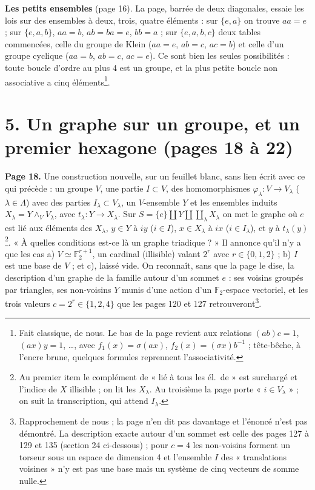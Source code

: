 \documentclass[11pt,a4paper]{article}
\begin{document}
\textbf{Les petits ensembles} (page 16). La page, barrée de deux diagonales,
essaie les lois sur des ensembles à deux, trois, quatre éléments : sur $\lbrace
e, a\rbrace$ on trouve $aa = e$ ; sur $\lbrace e, a, b\rbrace$, $aa = b$, $ab =
ba = e$, $bb = a$ ; sur $\lbrace e, a, b, c\rbrace$ deux tables commencées, celle du
groupe de Klein ($aa = e$, $ab = c$, $ac = b$) et celle d'un groupe cyclique
($aa = b$, $ab = c$, $ac = e$). Ce sont bien les seules possibilités : toute
boucle d'ordre au plus 4 est un groupe, et la plus petite boucle non
associative a cinq éléments\footnote{Fait classique, de nous. Le bas de la page
revient aux relations $(ab)c = 1$, $(ax)y = 1$, \ldots, avec $f_1(x) =
\sigma(ax)$, $f_2(x) = (\sigma x)b^{-1}$ ; tête-bêche, à l'encre brune, quelques
formules reprennent l'associativité.}.

\section*{5. Un graphe sur un groupe, et un premier hexagone (pages 18 à 22)}

\textbf{Page 18.} Une construction nouvelle, sur un feuillet blanc, sans lien
écrit avec ce qui précède : un groupe $V$, une partie $I \subset V$, des
homomorphismes $\varphi_\lambda : V \to V_\lambda$ ($\lambda \in \Lambda$) avec
des parties $I_\lambda \subset V_\lambda$, un $V$-ensemble $Y$ et les
ensembles induits $X_\lambda = Y \wedge_V V_\lambda$, avec $t_\lambda : Y \to
X_\lambda$. Sur $S = \lbrace e\rbrace \amalg Y \amalg \coprod_\lambda
X_\lambda$ on met le graphe où $e$ est lié aux éléments des $X_\lambda$, $y \in
Y$ à $iy$ ($i \in I$), $x \in X_\lambda$ à $ix$ ($i \in I_\lambda$), et $y$ à
$t_\lambda(y)$\footnote{Au premier item le complément de « lié à tous les él.\
de » est surchargé et l'indice de $X$ illisible ; on lit les $X_\lambda$. Au
troisième la page porte « $i \in V_\lambda$ » ; on suit la transcription, qui
attend $I_\lambda$.}. « À quelles conditions est-ce là un graphe triadique ? »
Il annonce qu'il n'y a que les cas a) $V \simeq \mathbb{F}_2^{r+1}$, un
cardinal (illisible) valant $2^r$ avec $r \in \lbrace 0, 1, 2\rbrace$ ; b) $I$
est une base de $V$ ; et c), laissé vide. On reconnaît, sans que la page le
dise, la description d'un graphe de la famille autour d'un sommet $e$ : ses
voisins groupés par triangles, ses non-voisins $Y$ munis d'une action d'un
$\mathbb{F}_2$-espace vectoriel, et les trois valeurs $c = 2^r \in \lbrace 1,
2, 4\rbrace$ que les pages 120 et 127 retrouveront\footnote{Rapprochement de
nous ; la page n'en dit pas davantage et l'énoncé n'est pas démontré. La
description exacte autour d'un sommet est celle des pages 127 à 129 et 135
(section 24 ci-dessous) ; pour $c = 4$ les non-voisins forment un torseur sous un
espace de dimension 4 et l'ensemble $I$ des « translations voisines » n'y est
pas une base mais un système de cinq vecteurs de somme nulle.}.
\end{document}

